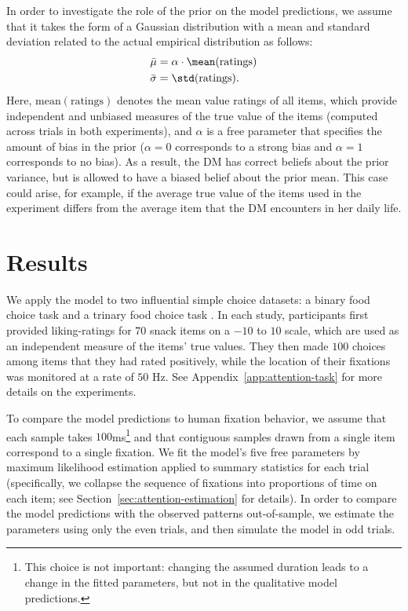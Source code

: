 In order to investigate the role of the prior on the model predictions, we assume that it takes the form of a Gaussian distribution with a mean and standard deviation related to the actual empirical distribution as follows:
\begin{equation}
\begin{aligned}
  \bar{\mu} &= \alpha \cdot \mean(\mathrm{ratings})\\
  \bar{\sigma} &= \std(\mathrm{ratings}).
\end{aligned}
\end{equation}
Here, $\mathrm{mean(ratings)}$ denotes the mean value ratings of all items, which provide independent and unbiased measures of the true value of the items (computed across trials in both experiments), and $\alpha$ is a free parameter that specifies the amount of bias in the prior ($\alpha=0$ corresponds to a strong bias and $\alpha=1$ corresponds to no bias). As a result, the DM has correct beliefs about the prior variance, but is allowed to have a biased belief about the prior mean. This case could arise, for example, if the average true value of the items used in the experiment differs from the average item that the DM encounters in her daily life. 


 
\section{Results}

We apply the model to two influential simple choice datasets: a binary food choice task \citep{krajbich2010visual} and a trinary food choice task \citep{krajbich2011multialternative}. In each study, participants first provided liking-ratings for $70$ snack items on a $-10$ to $10$ scale, which are used as an independent measure of the items' true values. They then made $100$ choices among items that they had rated positively, while the location of their fixations was monitored at a rate of $50$ Hz. See Appendix~\ref{app:attention-task} for more details on the experiments.

To compare the model predictions to human fixation behavior, we assume that each sample takes $100$ms\footnote{This choice is not important: changing the assumed duration leads to a change in the fitted parameters, but not in the qualitative model predictions.} and that contiguous samples drawn from a single item correspond to a single fixation. We fit the model's five free parameters by maximum likelihood estimation applied to summary statistics for each trial (specifically, we collapse the sequence of fixations into proportions of time on each item; see Section~\ref{sec:attention-estimation} for details). In order to compare the model predictions with the observed patterns out-of-sample, we estimate the parameters using only the even trials, and then simulate the model in odd trials. 

